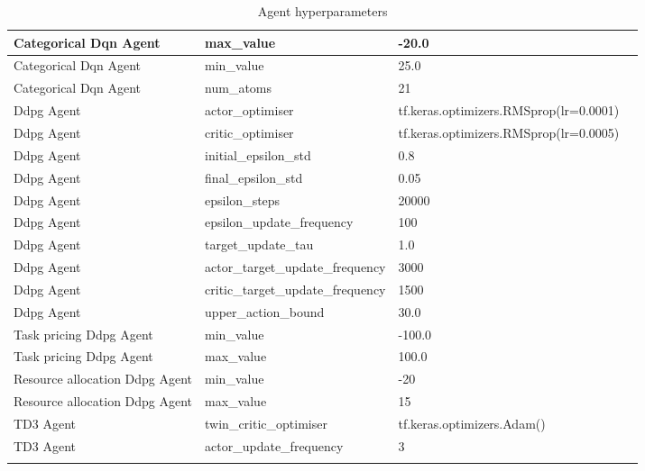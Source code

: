 \begin{longtable}{|p{3.5cm}|p{3.5cm}|p{3.5cm}|p{3.5cm}|}
        Categorical Dqn Agent & max\_value & -20.0 & \\ \hline
        Categorical Dqn Agent & min\_value & 25.0 & \\ \hline
        Categorical Dqn Agent & num\_atoms & 21 & \\ \hline \hline
        Ddpg Agent & actor\_optimiser & tf.keras.optimizers.RMSprop(lr=0.0001) & \\ \hline
        Ddpg Agent & critic\_optimiser & tf.keras.optimizers.RMSprop(lr=0.0005) & \\ \hline
        Ddpg Agent & initial\_epsilon\_std & 0.8 & \\ \hline
        Ddpg Agent & final\_epsilon\_std & 0.05 & \\ \hline
        Ddpg Agent & epsilon\_steps & 20000 & \\ \hline
        Ddpg Agent & epsilon\_update\_frequency & 100 & \\ \hline
        Ddpg Agent & target\_update\_tau & 1.0 & \\ \hline
        Ddpg Agent & actor\_target\_update\_frequency & 3000 & \\ \hline
        Ddpg Agent & critic\_target\_update\_frequency & 1500 & \\ \hline
        Ddpg Agent & upper\_action\_bound & 30.0 & \\ \hline \hline
        Task pricing Ddpg Agent & min\_value & -100.0 & \\ \hline
        Task pricing Ddpg Agent & max\_value & 100.0 & \\ \hline \hline
        Resource allocation Ddpg Agent & min\_value & -20 & \\ \hline
        Resource allocation Ddpg Agent & max\_value & 15 & \\ \hline \hline
        TD3 Agent & twin\_critic\_optimiser & tf.keras.optimizers.Adam() & \\ \hline
        TD3 Agent & actor\_update\_frequency & 3 & \\ \hline
    \caption{Agent hyperparameters}
    \label{tab:agent_hyperparameters}
\end{longtable}


